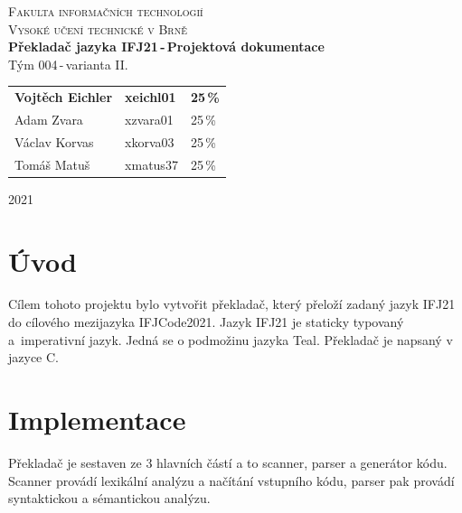 \documentclass[11pt]{article}
\begin{document}
\begin{titlepage}
\begin{center}

\Huge\textsc{Fakulta informačních technologií\\
Vysoké učení technické v Brně}\\
\LARGE
\textbf{Překladač jazyka IFJ21\,-\,Projektová dokumentace}\\
Tým 004\,-\,varianta II.

\begin{table}[ht]
    \centering
    \begin{tabular}{l l l}
        \textbf{Vojtěch Eichler} & \textbf{xeichl01} & \textbf{25\,\%}\\
        Adam Zvara & xzvara01 & 25\,\%\\
        Václav Korvas & xkorva03 & 25\,\%\\
        Tomáš Matuš & xmatus37 & 25\,\%
    \end{tabular}
\end{table}

\Large
2021
\end{center}
\end{titlepage}

\section{Úvod}
Cílem tohoto projektu bylo vytvořit překladač, který přeloží zadaný jazyk IFJ21 do cílového mezijazyka \mbox{IFJCode2021.}
Jazyk IFJ21 je staticky typovaný a~imperativní jazyk. Jedná se o podmožinu jazyka Teal.
Překladač je napsaný v jazyce C.

\section{Implementace}
Překladač je sestaven ze 3 hlavních částí a to scanner, parser a generátor kódu.
Scanner provádí lexikální analýzu a načítání vstupního kódu, parser pak provádí syntaktickou a sémantickou analýzu.
\end{document}
